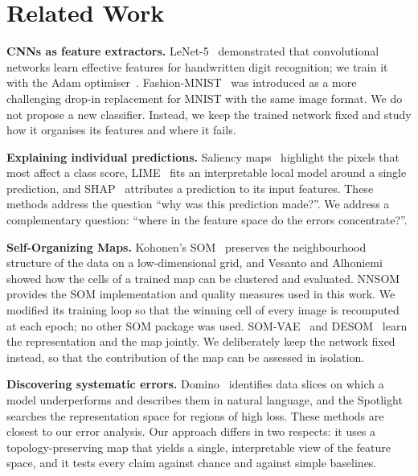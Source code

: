 \documentclass{scrartcl}
\begin{document}
\section{Related Work}\label{sec:related}

\textbf{CNNs as feature extractors.} LeNet-5~\cite{lecun1998gradient} demonstrated that convolutional networks learn effective features for handwritten digit recognition; we train it with the Adam optimiser~\cite{kingma2015adam}. Fashion-MNIST~\cite{xiao2017fashion} was introduced as a more challenging drop-in replacement for MNIST with the same image format. We do not propose a new classifier. Instead, we keep the trained network fixed and study how it organises its features and where it fails.

\textbf{Explaining individual predictions.} Saliency maps~\cite{simonyan2014saliency} highlight the pixels that most affect a class score, LIME~\cite{ribeiro2016lime} fits an interpretable local model around a single prediction, and SHAP~\cite{lundberg2017shap} attributes a prediction to its input features. These methods address the question ``why was this prediction made?''. We address a complementary question: ``where in the feature space do the errors concentrate?''.

\textbf{Self-Organizing Maps.} Kohonen's SOM~\cite{kohonen1990som} preserves the neighbourhood structure of the data on a low-dimensional grid, and Vesanto and Alhoniemi~\cite{vesanto2000clustering} showed how the cells of a trained map can be clustered and evaluated. NNSOM~\cite{jafari_nnsom} provides the SOM implementation and quality measures used in this work. We modified its training loop so that the winning cell of every image is recomputed at each epoch; no other SOM package was used. SOM-VAE~\cite{fortuin2019somvae} and DESOM~\cite{forest2021desom} learn the representation and the map jointly. We deliberately keep the network fixed instead, so that the contribution of the map can be assessed in isolation.

\textbf{Discovering systematic errors.} Domino~\cite{eyuboglu2022domino} identifies data slices on which a model underperforms and describes them in natural language, and the Spotlight~\cite{deon2022spotlight} searches the representation space for regions of high loss. These methods are closest to our error analysis. Our approach differs in two respects: it uses a topology-preserving map that yields a single, interpretable view of the feature space, and it tests every claim against chance and against simple baselines.
\end{document}
